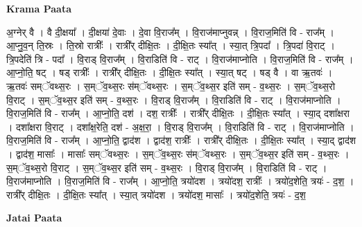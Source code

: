 \documentclass[17pt]{extarticle}
\begin{document}
\textbf{Krama Paata} \newline

अ॒ग्नेर् वै । वै दी॒क्षया᳚ । दी॒क्षया॑ दे॒वाः । दे॒वा वि॒राज᳚म् । वि॒राज॑माप्नुवन्न् । वि॒राज॒मिति॑ वि - राज᳚म् । आ॒प्नु॒व॒न् ति॒स्रः । ति॒स्रो रात्रीः᳚ । रात्री᳚र् दीक्षि॒तः । दी॒क्षि॒तः स्या᳚त् । स्या॒त् त्रि॒पदा᳚ । त्रि॒पदा॑ वि॒राट् । त्रि॒पदेति॑ त्रि - पदा᳚ । वि॒राड् वि॒राज᳚म् । वि॒राडिति॑ वि - राट् । वि॒राज॑माप्नोति । वि॒राज॒मिति॑ वि - राज᳚म् । आ॒प्नो॒ति॒ षट् । षड् रात्रीः᳚ । रात्री᳚र् दीक्षि॒तः । दी॒क्षि॒तः स्या᳚त् । स्या॒त् षट् । षड् वै । वा ऋ॒तवः॑ । ऋ॒तवः॑ सम्ॅवथ्स॒रः । स॒म्ॅव॒थ्स॒रः स॑म्ॅवथ्स॒रः । स॒म्ॅव॒थ्स॒र इति॑ सम् - व॒थ्स॒रः । स॒म्ॅव॒थ्स॒रो वि॒राट् । स॒म्ॅव॒थ्स॒र इति॑ सम् - व॒थ्स॒रः । वि॒राड् वि॒राज᳚म् । वि॒राडिति॑ वि - राट् । वि॒राज॑माप्नोति । वि॒राज॒मिति॑ वि - राज᳚म् । आ॒प्नो॒ति॒ दश॑ । दश॒ रात्रीः᳚ । रात्री᳚र् दीक्षि॒तः । दी॒क्षि॒तः स्या᳚त् । स्या॒द् दशा᳚क्षरा । दशा᳚क्षरा वि॒राट् । दशा᳚क्ष॒रेति॒ दश॑ - अ॒क्ष॒रा॒ । वि॒राड् वि॒राज᳚म् । वि॒राडिति॑ वि - राट् । वि॒राज॑माप्नोति । वि॒राज॒मिति॑ वि - राज᳚म् । आ॒प्नो॒ति॒ द्वाद॑श । द्वाद॑श॒ रात्रीः᳚ । रात्री᳚र् दीक्षि॒तः । दी॒क्षि॒तः स्या᳚त् । स्या॒द् द्वाद॑श । द्वाद॑श॒ मासाः᳚ । मासाः᳚ सम्ॅवथ्स॒रः । स॒म्ॅव॒थ्स॒रः स॑म्ॅवथ्स॒रः । स॒म्ॅव॒थ्स॒र इति॑ सम् - व॒थ्स॒रः । स॒म्ॅव॒थ्स॒रो वि॒राट् । स॒म्ॅव॒थ्स॒र इति॑ सम् - व॒थ्स॒रः । वि॒राड् वि॒राज᳚म् । वि॒राडिति॑ वि - राट् । वि॒राज॑माप्नोति । वि॒राज॒मिति॑ वि - राज᳚म् । आ॒प्नो॒ति॒ त्रयो॑दश । त्रयो॑दश॒ रात्रीः᳚ । त्रयो॑द॒शेति॒ त्रयः॑ - द॒श॒ । रात्री᳚र् दीक्षि॒तः । दी॒क्षि॒तः स्या᳚त् । स्या॒त् त्रयो॑दश । त्रयो॑दश॒ मासाः᳚ । त्रयो॑द॒शेति॒ त्रयः॑ - द॒श॒ \newline

\textbf{Jatai Paata} \newline
\end{document}
